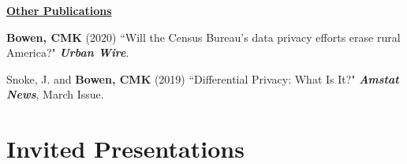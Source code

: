\documentclass[11pt, letterpaper, roman]{moderncv} %
\begin{document}
\vspace{6pt}
\noindent\underline{\textbf{Other Publications}}

\vspace{4pt}
\begin{etaremune}[topsep=0pt, itemsep=12pt, partopsep=0pt, parsep=0pt]
    \item \textbf{Bowen, CMK} (2020) ``Will the Census Bureau's data privacy efforts erase rural America?" \textbf{\textit{Urban Wire}}. 
    \item Snoke, J. and \textbf{Bowen, CMK} (2019) ``Differential Privacy: What Is It?" \textbf{\textit{Amstat News}}, March Issue.
\end{etaremune}

    
    


\newpage
\section{Invited Presentations}
\end{document}
